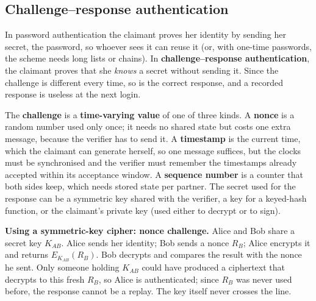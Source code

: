\subsection{Challenge--response authentication \new}

In password authentication the claimant proves her identity by sending her secret, the password, so whoever sees it can reuse it (or, with one-time passwords, the scheme needs long lists or chains). In \textbf{challenge--response authentication}, the claimant proves that she \emph{knows} a secret without sending it.  Since the challenge is different every time, so is the correct response, and a recorded response is useless at the next login.

The \textbf{challenge} is a \textbf{time-varying value} of one of three kinds. A \textbf{nonce} is a random number used only once; it needs no shared state but costs one extra message, because the verifier has to send it. A \textbf{timestamp} is the current time, which the claimant can generate herself, so one message suffices, but the clocks must be synchronised and the verifier must remember the timestamps already accepted within its acceptance window. A \textbf{sequence number} is a counter that both sides keep, which needs stored state per partner. The secret used for the response can be a symmetric key shared with the verifier, a key for a keyed-hash function, or the claimant's private key (used either to decrypt or to sign).

\textbf{Using a symmetric-key cipher: nonce challenge.} Alice and Bob share a secret key $K_{AB}$. Alice sends her identity; Bob sends a nonce $R_B$; Alice encrypts it and returns $E_{K_{AB}}(R_B)$. Bob decrypts and compares the result with the nonce he sent. Only someone holding $K_{AB}$ could have produced a ciphertext that decrypts to this fresh $R_B$, so Alice is authenticated; since $R_B$ was never used before, the response cannot be a replay. The key itself never crosses the line.

